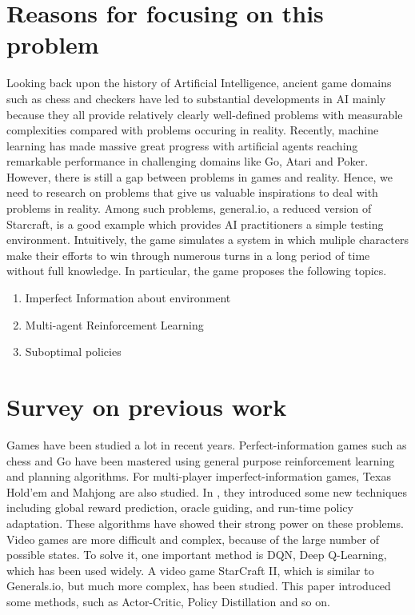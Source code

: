 \documentclass{elegantpaper}
\begin{document}
\section{Reasons for focusing on this problem}
Looking back upon the history of Artificial Intelligence, ancient game domains such as chess and checkers have led to substantial developments in AI mainly because they all provide relatively clearly well-defined problems with measurable complexities compared with problems occuring in reality. Recently, machine learning has made massive great progress with artificial agents reaching remarkable performance in challenging domains like Go, Atari and Poker. However, there is still a gap between problems in games and reality. Hence, we need to research on problems that give us valuable inspirations to deal with problems in reality. Among such problems, general.io, a reduced version of Starcraft, is a good example which provides AI practitioners a simple testing environment. Intuitively, the game simulates a system in which muliple characters make their efforts to win through numerous turns in a long period of time without full knowledge. In particular, the game proposes the following topics.
\begin{enumerate}[noitemsep]
	\item Imperfect Information about environment
	\item Multi-agent Reinforcement Learning
	\item Suboptimal policies
\end{enumerate}{}

\section{Survey on previous work}
Games have been studied a lot in recent years. Perfect-information games such as chess and Go have been mastered using general purpose reinforcement learning and planning algorithms. For multi-player imperfect-information games, Texas Hold'em\cite{Deepstack17} and
Mahjong\cite{Suphx} are also studied. In \cite{Suphx}, they introduced some new techniques including global reward prediction, oracle guiding, and run-time policy adaptation. These algorithms have showed their strong power on these problems.
Video games are more difficult and complex, because of the large number of possible states. To solve it, one important method is DQN, Deep Q-Learning, which has been used widely. A video game StarCraft II, which is similar to Generals.io, but much more complex, has been studied\cite{Deepmind19}. This paper introduced some methods, such as Actor-Critic, Policy Distillation and so on.
\end{document}
